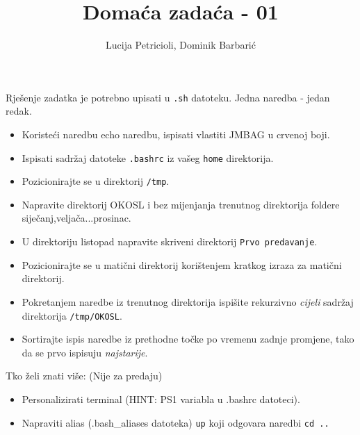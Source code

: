 \documentclass[12pt,a4paper]{article}
\newcommand{\shell}[1]{\texttt{#1}}
\begin{document}
  \title{Domaća zadaća - 01}
  \author{Lucija Petricioli, Dominik Barbarić}
  \maketitle
  Rješenje zadatka je potrebno upisati u \shell{.sh} datoteku. Jedna naredba - jedan redak.
  \begin{itemize}
    \item Koristeći naredbu echo naredbu, ispisati vlastiti JMBAG u crvenoj boji.
    \item Ispisati sadržaj datoteke \shell{.bashrc} iz vašeg \shell{home} direktorija.
    \item Pozicionirajte se u direktorij \shell{/tmp}.
    \item Napravite direktorij OKOSL i bez mijenjanja trenutnog direktorija foldere siječanj,veljača...prosinac.
    \item U direktoriju listopad napravite skriveni direktorij \shell{Prvo predavanje}.
    \item Pozicionirajte se u matični direktorij korištenjem kratkog izraza za matični direktorij.
    \item Pokretanjem naredbe iz trenutnog direktorija ispišite rekurzivno \textit{cijeli} sadržaj direktorija \shell{/tmp/OKOSL}.
    \item Sortirajte ispis naredbe iz prethodne točke po vremenu zadnje promjene, tako da se prvo ispisuju \textit{najstarije}.
  \end{itemize}
  Tko želi znati više: (Nije za predaju)
  \begin{itemize}
    \item Personalizirati terminal (HINT: PS1 variabla u .bashrc datoteci).
    \item Napraviti alias (.bash\_aliases datoteka) \shell{up} koji odgovara naredbi \shell{cd ..}
  \end{itemize}
\end{document}
